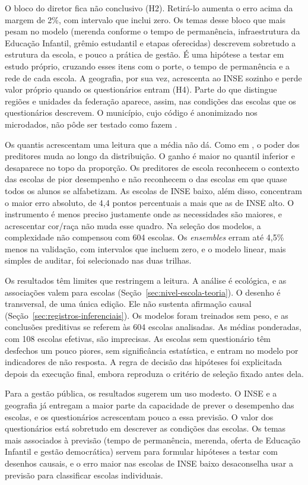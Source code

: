 O bloco do diretor fica não conclusivo (H2). Retirá-lo aumenta o erro
acima da margem de 2\%, com intervalo que inclui zero. Os temas
desse bloco que mais pesam no modelo (merenda conforme o tempo de permanência,
infraestrutura da Educação Infantil, grêmio estudantil e etapas oferecidas)
descrevem sobretudo a estrutura da escola, e pouco a prática de gestão. É
uma hipótese a testar em estudo próprio, cruzando esses itens com o porte, o
tempo de permanência e a rede de cada escola. A geografia, por sua vez, acrescenta ao
INSE sozinho e perde valor próprio quando os questionários entram (H4).
Parte do que distingue regiões e unidades da federação aparece, assim, nas
condições das escolas que os questionários descrevem. O município, cujo
código é anonimizado nos microdados, não pôde ser testado como fazem
.

Os quantis acrescentam uma leitura que a média não dá. Como em
, o poder dos preditores muda ao longo
da distribuição. O ganho é maior no quantil inferior e desaparece no topo
da proporção. Os preditores de escola reconhecem o contexto das escolas de
pior desempenho e não reconhecem o das escolas em que quase todos os
alunos se alfabetizam. As escolas de INSE baixo, além disso, concentram o
maior erro absoluto, de 4,4 pontos percentuais a mais que as de INSE alto.
O instrumento é menos preciso justamente onde as necessidades são maiores,
e acrescentar cor/raça não muda esse quadro. Na seleção dos modelos, a
complexidade não compensou com 604 escolas. Os \textit{ensembles} erram até
4,5\% menos na validação, com intervalos que incluem zero, e o modelo
linear, mais simples de auditar, foi selecionado nas duas trilhas.

Os resultados têm limites que restringem a leitura. A análise é ecológica,
e as associações valem para escolas (Seção~\ref{sec:nivel-escola-teoria}).
O desenho é transversal, de uma única edição. Ele não sustenta afirmação
causal (Seção~\ref{sec:registros-inferenciais}). Os modelos foram
treinados sem peso, e as conclusões preditivas se referem às 604 escolas
analisadas. As médias ponderadas, com 108 escolas efetivas, são
imprecisas. As escolas sem questionário têm desfechos um pouco piores,
sem significância estatística, e entram no modelo por indicadores de não
resposta.
A regra de decisão das hipóteses foi explicitada depois da execução final,
embora reproduza o critério de seleção fixado antes dela.

Para a gestão pública, os resultados sugerem um uso modesto. O INSE e a
geografia já entregam a maior parte da capacidade de prever o desempenho
das escolas, e os questionários acrescentam pouco a essa previsão. O valor
dos questionários está sobretudo em descrever as condições das escolas. Os temas mais associados à previsão
(tempo de permanência, merenda, oferta de Educação Infantil e gestão
democrática) servem
para formular hipóteses a testar com desenhos causais, e o erro maior nas
escolas de INSE baixo desaconselha usar a previsão para classificar escolas
individuais.
